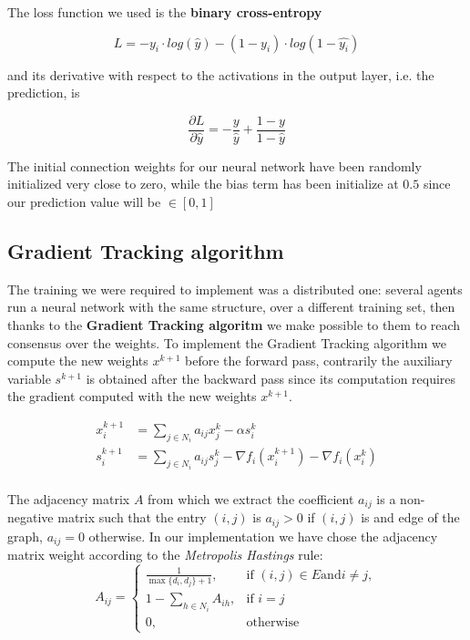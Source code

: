 \documentclass[a4paper,11pt,oneside]{book}
\begin{document}
The loss function we used is the \textbf{binary cross-entropy}

\begin{equation}
L = - y_i \cdot log(\hat{y}) - (1 - y_i) \cdot log(1 - \hat{y_i})
\end{equation}

and its derivative with respect to the activations in the output layer, i.e. the prediction, is

\begin{equation}
\frac{\partial L}{\partial \hat{y}} = - \frac{y}{\hat{y}} + \frac{1 - y}{1 - \hat{y}}
\end{equation}

\bigskip 
The initial connection weights for our neural network have been randomly initialized very close to zero, while the bias term has been initialize at $0.5$ since our prediction value will be $\in[0,1]$ 

\subsection{Gradient Tracking algorithm}
The training we were required to implement was a distributed one: several agents run a neural network with the same structure, over a different training set, then thanks to the \textbf{Gradient Tracking algoritm} we make possible to them to reach consensus over the weights.
To implement the Gradient Tracking algorithm we compute the new weights $x^{k+1}$ before the forward pass, contrarily the auxiliary variable $s^{k+1}$ is obtained after the backward pass since its computation requires the gradient computed with the new weights $x^{k+1}$.

\begin {equation}
\begin{split}
x_i^{k+1} &= \sum_{j \in N_i} a_{ij} x_j^k - \alpha s_i^k \\
s_i^{k+1}   &= \sum_{j \in N_i} a_{ij} s_j^k - \nabla f_i(x_i^{k+1}) - \nabla f_i(x_i^k) \\
\end{split}
\end{equation}

The adjacency matrix $A$ from which we extract the coefficient $a_{ij}$ is a non-negative matrix such that the entry $(i,j)$ is $a_{ij}>0$ if $(i,j)$ is and edge of the graph, $a_{ij}=0$ otherwise.
In our implementation we have chose the adjacency matrix weight according to the \textit{Metropolis Hastings} rule:
\begin{equation}
A_{ij} = 
\begin{cases}
\frac{1}{\max\{d_i,d_j\}+1},  &\text{if } (i,j) \in E \text{and} i \neq j, \\
1-\sum_{h \in N_i} A_{ih}, &\text{if }  i=j \\
0, &\text{otherwise}
\end{cases}
\end{equation}
\end{document}
